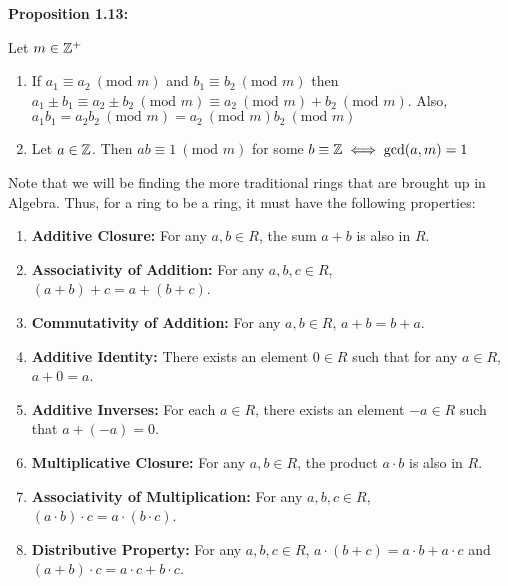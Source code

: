 \hypertarget{prop 1.13}{\textbf{Proposition 1.13:}} Let \(m \in \mathbb{Z}^+\)
\begin{enumerate}
    \item If \(a_1 \equiv a_2 \ (\text{mod } m)\) and \(b_1 \equiv b_2 \ (\text{mod } m)\) then \(a_1 \pm b_1 \equiv a_2 \pm b_2 \ (\text{mod } m) \equiv a_2\ (\text{mod } m) + b_2\ (\text{mod } m)\). Also, \(a_1b_1 = a_2b_2\ (\text{mod } m)=a_2\ (\text{mod } m) b_2\ (\text{mod } m)\)
    \item Let \(a \in \mathbb{Z}\). Then \(ab \equiv 1\ (\text{mod } m)\) for some \(b\equiv \mathbb{Z} \iff \gcd(a,m)=1\)
\end{enumerate}


Note that we will be finding the more traditional rings that are brought up in Algebra. Thus, for a ring to be a ring, it must have the following properties: \begin{enumerate}[label=\arabic*.]
    \item \textbf{Additive Closure:} For any \( a, b \in R \), the sum \( a + b \) is also in \( R \).
    \item \textbf{Associativity of Addition:} For any \( a, b, c \in R \), \( (a + b) + c = a + (b + c) \).
    \item \textbf{Commutativity of Addition:} For any \( a, b \in R \), \( a + b = b + a \).
    \item \textbf{Additive Identity:} There exists an element \( 0 \in R \) such that for any \( a \in R \), \( a + 0 = a \).
    \item \textbf{Additive Inverses:} For each \( a \in R \), there exists an element \( -a \in R \) such that \( a + (-a) = 0 \).
    \item \textbf{Multiplicative Closure:} For any \( a, b \in R \), the product \( a \cdot b \) is also in \( R \).
    \item \textbf{Associativity of Multiplication:} For any \( a, b, c \in R \), \( (a \cdot b) \cdot c = a \cdot (b \cdot c) \).
    \item \textbf{Distributive Property:} For any \( a, b, c \in R \), \( a \cdot (b + c) = a \cdot b + a \cdot c \) and \( (a + b) \cdot c = a \cdot c + b \cdot c \).
\end{enumerate}

